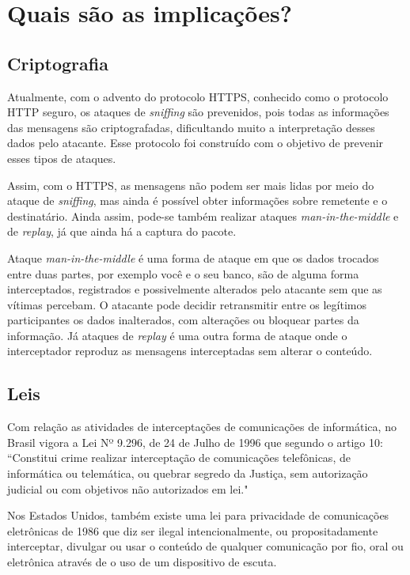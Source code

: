 \section{Quais são as implicações? \label{sec:implicacoes}}

\subsection{Criptografia \label{sec:criptografia}}

Atualmente, com o advento do protocolo HTTPS, conhecido como o protocolo HTTP seguro, os ataques de \textit{sniffing} são prevenidos, pois todas as informações das mensagens são criptografadas, dificultando muito a interpretação desses dados pelo atacante. Esse protocolo foi construído com o objetivo de prevenir esses tipos de ataques.

Assim, com o HTTPS, as mensagens não podem ser mais lidas por meio do ataque de \textit{sniffing}, mas ainda é possível obter informações sobre remetente e o destinatário. Ainda assim, pode-se também realizar ataques \textit{man-in-the-middle} e de \textit{replay}, já que ainda há a captura do pacote.

Ataque \textit{man-in-the-middle} é uma forma de ataque em que os dados trocados entre duas partes, por exemplo você e o seu banco, são de alguma forma interceptados, registrados e possivelmente alterados pelo atacante sem que as vítimas percebam. O atacante pode decidir retransmitir entre os legítimos participantes os dados inalterados, com alterações ou bloquear partes da informação. Já ataques de \textit{replay} é uma outra forma de ataque onde o interceptador reproduz as mensagens interceptadas sem alterar o conteúdo.

\subsection{Leis \label{sec:leis}}

Com relação as atividades de interceptações de comunicações de informática, no Brasil vigora a Lei Nº 9.296, de 24 de Julho de 1996 que segundo o artigo 10: ``Constitui crime realizar interceptação de comunicações telefônicas, de informática ou telemática, ou quebrar segredo da Justiça, sem autorização judicial ou com objetivos não autorizados em lei."~\cite{bib:lei1}

Nos Estados Unidos, também existe uma lei para privacidade de comunicações eletrônicas  de 1986 que diz ser ilegal intencionalmente, ou propositadamente interceptar, divulgar ou usar o conteúdo de qualquer comunicação por fio, oral ou eletrônica através de o uso de um dispositivo de escuta.~\cite{bib:lei2}

